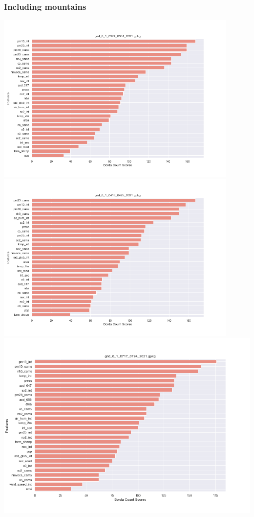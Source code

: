 \subsubsection{Including mountains}
\begin{center}
\includegraphics[width=0.9\textwidth]{images/fs_results/nh3/01/montains/grid_0_1_0324_0331_2021.png}
\includegraphics[width=0.9\textwidth]{images/fs_results/nh3/01/montains/grid_0_1_0418_0425_2021.png}
\includegraphics[width=.9\textwidth]{images/fs_results/nh3/01/montains/grid_0_1_0717_0724_2021.png}

\end{center}
